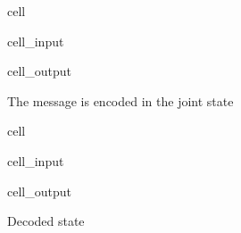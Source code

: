 \documentclass[letterpaper,10pt,english]{jupyterBook}
\begin{document}
\begin{sphinxuseclass}{cell}\begin{sphinxVerbatimInput}

\begin{sphinxuseclass}{cell_input}
\begin{sphinxVerbatim}[commandchars=\\\{\}]
   
\end{sphinxVerbatim}

\end{sphinxuseclass}\end{sphinxVerbatimInput}
\begin{sphinxVerbatimOutput}

\begin{sphinxuseclass}{cell_output}
\begin{sphinxVerbatim}[commandchars=\\\{\}]
The message is encoded in the joint state
\end{sphinxVerbatim}

\noindent{}

\end{sphinxuseclass}\end{sphinxVerbatimOutput}

\end{sphinxuseclass}
\begin{sphinxuseclass}{cell}\begin{sphinxVerbatimInput}

\begin{sphinxuseclass}{cell_input}
\begin{sphinxVerbatim}[commandchars=\\\{\}]
\end{sphinxVerbatim}

\end{sphinxuseclass}\end{sphinxVerbatimInput}
\begin{sphinxVerbatimOutput}

\begin{sphinxuseclass}{cell_output}
\begin{sphinxVerbatim}[commandchars=\\\{\}]
Decoded state
\end{sphinxVerbatim}

\noindent{}

\end{sphinxuseclass}\end{sphinxVerbatimOutput}

\end{sphinxuseclass}
\end{document}
